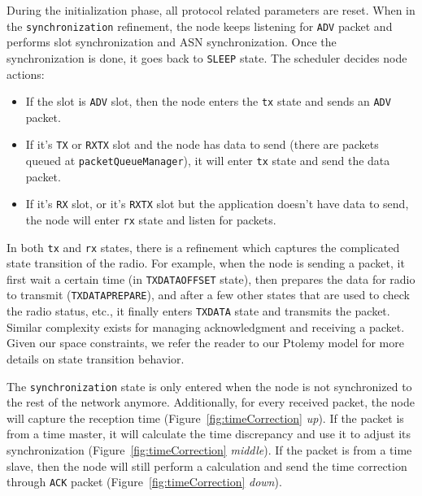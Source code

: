 During the initialization phase, all protocol related parameters are reset. When in the \texttt{synchronization} refinement, the node keeps listening for \texttt{ADV} packet and performs slot synchronization and ASN synchronization. Once the synchronization is done, it goes back to \texttt{SLEEP} state.
The scheduler decides node actions: 
\begin{itemize}
\item If the slot is \texttt{ADV} slot, then the node enters the \texttt{tx} state and sends an \texttt{ADV} packet. 
\item If it's \texttt{TX} or \texttt{RXTX} slot and the node has data to send (there are packets queued at \texttt{packetQueueManager}), it will enter \texttt{tx} state and send the data packet. 
\item If it's \texttt{RX} slot, or it's \texttt{RXTX} slot but the application doesn't have data to send, the node will enter \texttt{rx} state and listen for packets.
\end{itemize}

In both \texttt{tx} and \texttt{rx} states, there is a refinement which captures the complicated state transition of the radio. For example, when the node is sending a packet, it first wait a certain time (in \texttt{TXDATAOFFSET} state), then prepares the data for radio to transmit (\texttt{TXDATAPREPARE}), and after a few other states that are used to check the radio status, etc., it finally enters \texttt{TXDATA} state and transmits the packet. Similar complexity exists for managing acknowledgment and receiving a packet. Given our space constraints, we refer the reader to our Ptolemy model for more details on state transition behavior.

The \texttt{synchronization} state is only entered when the node is not synchronized to the rest of the network anymore. Additionally, for every received packet, the node will capture the reception time (Figure~\ref{fig:timeCorrection} {\em up}). If the packet is from a time master, it will calculate the time discrepancy and use it to adjust its synchronization (Figure~\ref{fig:timeCorrection} {\em middle}). If the packet is from a time slave, then the node will still perform a calculation and send the time correction through \texttt{ACK} packet (Figure~\ref{fig:timeCorrection} {\em down}).


